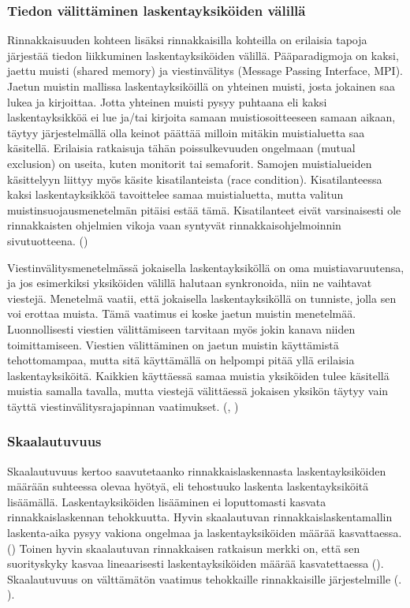 \subsubsection{Tiedon välittäminen laskentayksiköiden välillä}

Rinnakkaisuuden kohteen lisäksi rinnakkaisilla kohteilla on erilaisia tapoja
järjestää tiedon liikkuminen laskentayksiköiden välillä. Pääparadigmoja on
kaksi, jaettu muisti (shared memory) ja viestinvälitys (Message Passing Interface, MPI). Jaetun muistin mallissa
laskentayksiköillä on yhteinen muisti, josta jokainen saa lukea ja kirjoittaa.
Jotta yhteinen muisti pysyy puhtaana eli kaksi laskentayksikköä ei lue ja/tai
kirjoita samaan muistiosoitteeseen samaan aikaan, täytyy järjestelmällä
olla keinot päättää milloin mitäkin muistialuetta saa käsitellä.
Erilaisia ratkaisuja tähän poissulkevuuden ongelmaan (mutual exclusion) on useita, kuten
monitorit tai semaforit. Samojen muistialueiden käsittelyyn
liittyy myös käsite kisatilanteista (race condition). Kisatilanteessa kaksi
laskentayksikköä tavoittelee samaa muistialuetta, mutta valitun
muistinsuojausmenetelmän pitäisi estää tämä. Kisatilanteet eivät varsinaisesti
ole rinnakkaisten ohjelmien vikoja vaan syntyvät rinnakkaisohjelmoinnin
sivutuotteena. (\citealt{ari})

Viestinvälitysmenetelmässä jokaisella
laskentayksiköllä on oma muistiavaruutensa, ja jos esimerkiksi  yksiköiden
välillä halutaan synkronoida, niin ne vaihtavat viestejä. Menetelmä vaatii,
että jokaisella laskentayksiköllä on tunniste, jolla sen voi erottaa muista.
Tämä vaatimus ei koske jaetun muistin menetelmää. Luonnollisesti viestien
välittämiseen tarvitaan myös jokin kanava niiden toimittamiseen. Viestien
välittäminen on jaetun muistin käyttämistä tehottomampaa, mutta sitä
käyttämällä on helpompi pitää yllä erilaisia laskentayksiköitä. Kaikkien
käyttäessä samaa muistia yksiköiden tulee käsitellä muistia samalla tavalla,
mutta viestejä välittäessä jokaisen yksikön täytyy vain täyttä
viestinvälitysrajapinnan vaatimukset. (\citealt{intro}, \citealt{rauber})

\subsubsection{Skaalautuvuus}

Skaalautuvuus kertoo saavutetaanko rinnakkaislaskennasta laskentayksiköiden määrään
suhteessa olevaa hyötyä, eli tehostuuko laskenta laskentayksiköitä lisäämällä.
Laskentayksiköiden lisääminen ei loputtomasti kasvata rinnakkaislaskennan
tehokkuutta. Hyvin skaalautuvan rinnakkaislaskentamallin laskenta-aika pysyy
vakiona ongelmaa ja laskentayksiköiden määrää kasvattaessa. (\citealt{rauber})
Toinen hyvin skaalautuvan rinnakkaisen ratkaisun merkki on, että sen suorityskyky
kasvaa lineaarisesti laskentayksiköiden määrää kasvatettaessa (\citealt{intro}).
Skaalautuvuus on välttämätön vaatimus tehokkaille rinnakkaisille järjestelmille
(\citealt{intro}. \citealt{rauber}).


